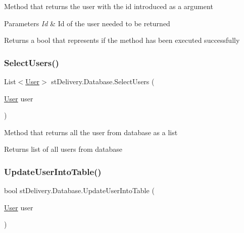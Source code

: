 Method that returns the user with the id introduced as a argument 


\begin{DoxyParams}{Parameters}
{\em Id} & Id of the user needed to be returned\\
\hline
\end{DoxyParams}
\begin{DoxyReturn}{Returns}
a bool that represents if the method has been executed successfully
\end{DoxyReturn}
\mbox{\label{classst_delivery_1_1_database_ac2d2e378d6f56010d919aeb701e79f92}} 
\subsubsection{\texorpdfstring{Select\+Users()}{SelectUsers()}}
{\footnotesize\ttfamily List$<$\hyperlink{classst_delivery_1_1_user}{User}$>$ st\+Delivery.\+Database.\+Select\+Users (\begin{DoxyParamCaption}\item[{\hyperlink{classst_delivery_1_1_user}{User}}]{user }\end{DoxyParamCaption})}



Method that returns all the user from database as a list 

\begin{DoxyReturn}{Returns}
list of all users from database
\end{DoxyReturn}
\mbox{\label{classst_delivery_1_1_database_a60b069ceff50d851b0ff76906c01df07}} 
\subsubsection{\texorpdfstring{Update\+User\+Into\+Table()}{UpdateUserIntoTable()}}
{\footnotesize\ttfamily bool st\+Delivery.\+Database.\+Update\+User\+Into\+Table (\begin{DoxyParamCaption}\item[{\hyperlink{classst_delivery_1_1_user}{User}}]{user }\end{DoxyParamCaption})}



